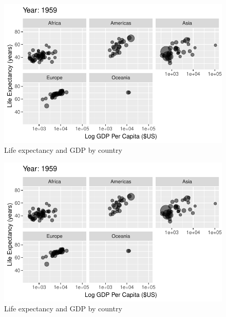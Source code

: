 \documentclass[
  letterpaper,
  DIV=11,
  numbers=noendperiod]{scrreport}
\theoremstyle{definition}
\theoremstyle{remark}
\begin{document}
\begin{figure}

{\centering \includegraphics{index_files/figure-pdf/fig-anim-lifegdp-13.pdf}

}

\caption{\label{fig-anim-lifegdp-13}Life expectancy and GDP by country}

\end{figure}

\begin{figure}

{\centering \includegraphics{index_files/figure-pdf/fig-anim-lifegdp-14.pdf}

}

\caption{\label{fig-anim-lifegdp-14}Life expectancy and GDP by country}

\end{figure}
\end{document}
